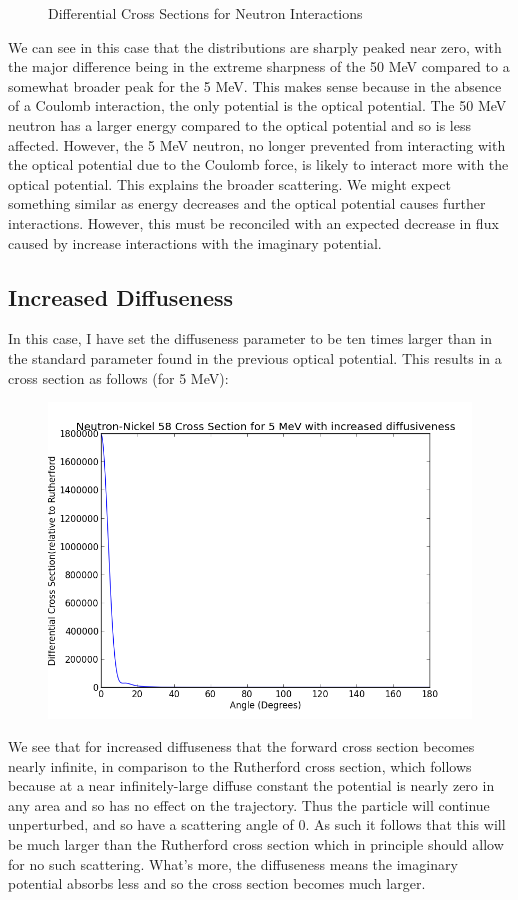 \documentclass[paper=a4, fontsize=11pt]{scrartcl} %
\numberwithin{equation}{section} %
\numberwithin{figure}{section} %
\numberwithin{table}{section} %
\begin{document}
\begin{figure}[hbt]
        \caption{Differential Cross Sections for Neutron Interactions}
\end{figure}

We can see in this case that the distributions are sharply peaked near zero, with the major difference being in the extreme sharpness of the 50 MeV compared to a somewhat  broader peak for the 5 MeV. This makes sense because in the absence of a Coulomb interaction, the only potential is the optical potential.  The 50 MeV neutron has a larger energy compared to the optical potential and so is less affected. However, the 5 MeV neutron, no longer prevented from interacting with the optical potential due to the Coulomb force, is likely to interact more with the optical potential. This explains the broader scattering. We might expect something similar as energy decreases and the optical potential causes further interactions. However, this must be reconciled with an expected decrease in flux caused by increase interactions with the imaginary potential.\\

\subsection{Increased Diffuseness}

In this case, I have set the diffuseness parameter to be ten times larger than in the standard parameter found in the previous optical potential. This results in a cross section as follows (for 5 MeV):\\
\begin{figure}[!hbt]
\centering
\includegraphics[width=.4\textwidth]{NeutronDiff.png}
\end{figure}

We see that for increased diffuseness that the forward cross section becomes nearly infinite, in comparison to the Rutherford cross section, which follows because at a near infinitely-large diffuse constant the potential is nearly zero in any area and so has no effect on the trajectory. Thus the particle will continue unperturbed, and so have a scattering angle of 0. As such it follows that this will be much larger than the Rutherford cross section which in principle should allow for no such scattering. What's more, the diffuseness means the imaginary potential absorbs less and so the cross section becomes much larger.\\
\end{document}
